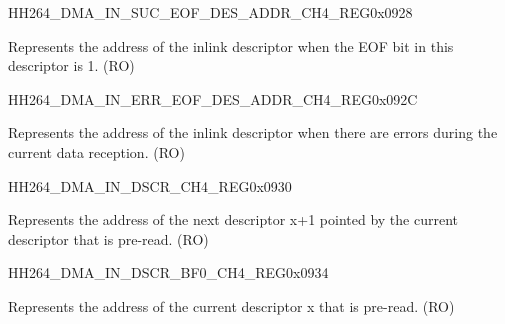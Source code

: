     
    \begin{register}{H}{H264\_DMA\_IN\_SUC\_EOF\_DES\_ADDR\_CH4\_REG}{0x0928}\label{regdesc:H264DMAINSUCEOFDESADDRCH4REG}
    \regnewline%
    \begin{regdesc}\begin{reglist}
    \label{fielddesc:H264DMAINSUCEOFDESADDRCH4}\item [H264\_DMA\_IN\_SUC\_EOF\_DES\_ADDR\_CH4] Represents the address of the inlink descriptor when the EOF bit in this descriptor is 1. (RO)
    \end{reglist}\end{regdesc}
    \end{register}
    
    
    \begin{register}{H}{H264\_DMA\_IN\_ERR\_EOF\_DES\_ADDR\_CH4\_REG}{0x092C}\label{regdesc:H264DMAINERREOFDESADDRCH4REG}
    \regnewline%
    \begin{regdesc}\begin{reglist}
    \label{fielddesc:H264DMAINERREOFDESADDRCH4}\item [H264\_DMA\_IN\_ERR\_EOF\_DES\_ADDR\_CH4] Represents the address of the inlink descriptor when there are errors during the current data reception. (RO)
    \end{reglist}\end{regdesc}
    \end{register}
    
    
    \begin{register}{H}{H264\_DMA\_IN\_DSCR\_CH4\_REG}{0x0930}\label{regdesc:H264DMAINDSCRCH4REG}
    \regnewline%
    \begin{regdesc}\begin{reglist}
    \label{fielddesc:H264DMAINLINKDSCRCH4}\item [H264\_DMA\_INLINK\_DSCR\_CH4] Represents the address of the next descriptor x+1 pointed by the current descriptor that is pre-read. (RO)
    \end{reglist}\end{regdesc}
    \end{register}
    
    
    \begin{register}{H}{H264\_DMA\_IN\_DSCR\_BF0\_CH4\_REG}{0x0934}\label{regdesc:H264DMAINDSCRBF0CH4REG}
    \regnewline%
    \begin{regdesc}\begin{reglist}
    \label{fielddesc:H264DMAINLINKDSCRBF0CH4}\item [H264\_DMA\_INLINK\_DSCR\_BF0\_CH4] Represents the address of the current descriptor x that is pre-read. (RO)
    \end{reglist}\end{regdesc}
    \end{register}
    
